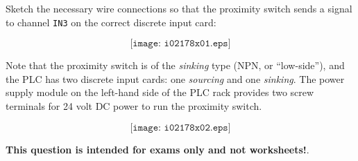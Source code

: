 

Sketch the necessary wire connections so that the proximity switch sends a signal to channel {\tt IN3} on the correct discrete input card:

$$\texttt{[image: i02178x01.eps]}$$

Note that the proximity switch is of the {\it sinking} type (NPN, or ``low-side''), and the PLC has two discrete input cards: one {\it sourcing} and one {\it sinking}.  The power supply module on the left-hand side of the PLC rack provides two screw terminals for 24 volt DC power to run the proximity switch.







$$\texttt{[image: i02178x02.eps]}$$







{\bf This question is intended for exams only and not worksheets!}.


